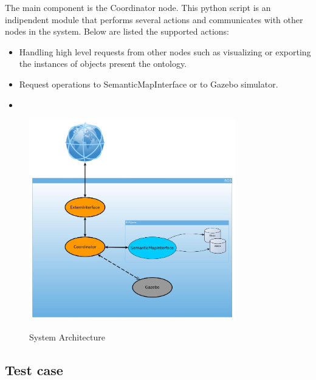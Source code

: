 The main component is the Coordinator node. This python script is an indipendent module that performs several actions and communicates with other nodes in the system. Below are listed the supported actions:

\begin{itemize}
\item Handling high level requests from other nodes such as visualizing or exporting the instances of objects present the ontology.
\item Request operations to SemanticMapInterface or to Gazebo simulator. 
\item 
\end{itemize}



\begin{figure}[H]
\centering
\includegraphics[width=0.8\textwidth]{imgs/architecture.jpg}
\label{fig:actions}
\caption{System Architecture}
\end{figure}


\subsection{Test case}